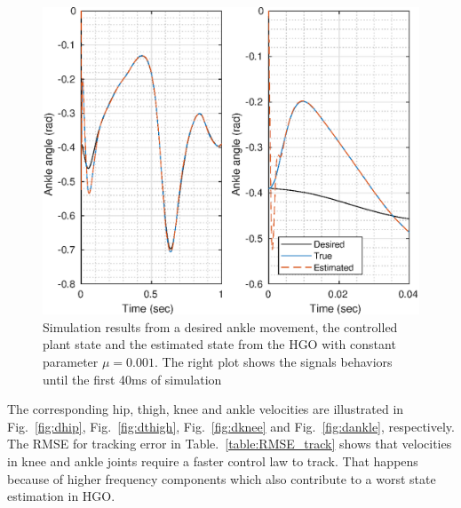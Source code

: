 \documentclass[letterpaper, 10 pt, journal, twocolumn]{IEEEtran}  %
\theoremstyle{plain}
\theoremstyle{definition}
\theoremstyle{remark}
\begin{document}
%
%
\begin{figure}[h!]
	\begin{center}
	\includegraphics[width = \columnwidth]{Figs/q_ankle_mu_1e-03.eps}
	\caption{ Simulation results from a desired ankle movement, the controlled plant state and the estimated state from the HGO with constant parameter $\mu=0.001$. The right plot shows the signals behaviors until the first 40ms of simulation}
	\label{fig:ankle}
	\end{center}
\end{figure}
%
%
%
%
The corresponding hip, thigh, knee and ankle velocities are illustrated in Fig.~\ref{fig:dhip}, Fig.~\ref{fig:dthigh}, Fig.~\ref{fig:dknee} and Fig.~\ref{fig:dankle}, respectively. The RMSE for tracking error in Table.~\ref{table:RMSE_track} shows that velocities in knee and ankle joints require a faster control law to track. That happens because of higher frequency components which also contribute to a worst state estimation in HGO.
%
%
\end{document}

